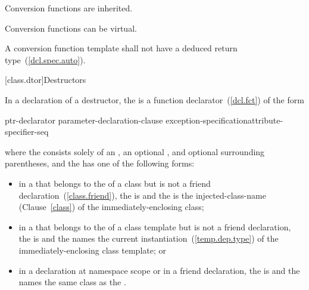 \pnum
{}%
Conversion functions are inherited.

\pnum
{}%
Conversion functions can be virtual.

\pnum
{}%
A conversion function template shall not have a
deduced return type~(\ref{dcl.spec.auto}).

[class.dtor]{Destructors}%

\pnum
In a declaration of a destructor, the  is a
function declarator~(\ref{dcl.fct}) of the form

\begin{ncbnf}
ptr-declarator \terminal{(} parameter-declaration-clause \terminal{)} exception-specification\opt attribute-specifier-seq\opt
\end{ncbnf}

where the  consists solely of an
, an optional ,
and optional surrounding parentheses, and the  has
one of the following forms:

\begin{itemize}
\item
in a  that belongs to the
 of a class but is not a friend
declaration~(\ref{class.friend}), the  is
\tcode{\~} and the  is the
injected-class-name (Clause~\ref{class}) of the immediately-enclosing class;

\item
in a  that belongs to the
 of a class template but is not a friend
declaration, the  is
\tcode{\~} and the  names the
current instantiation~(\ref{temp.dep.type}) of the immediately-enclosing class template; or

\item
in a declaration at namespace scope or in a friend declaration, the
 is 
\tcode{\~} and the  names the
same class as the .
\end{itemize}

